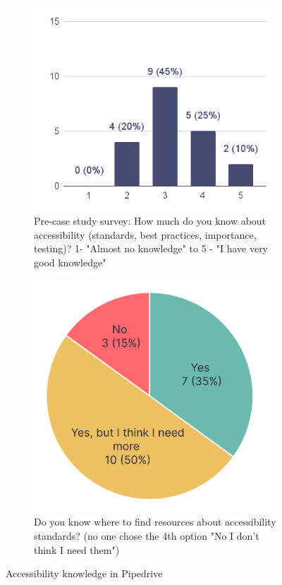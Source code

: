 \documentclass{master_thesis}
\begin{document}
\begin{figure}[ht]
    \centering
	\begin{subfigure}{0.5\textwidth}
		\includegraphics[width=\textwidth]{img/a11y-knowledge.png}
		\caption{Pre-case study survey: How much do you know about accessibility (standards, best practices, importance, testing)? 1- "Almost no knowledge" to 5 - "I have very good knowledge" }
		\label{fig:a11y-knowledge-current}
	\end{subfigure}
	\hspace{0.05\textwidth}
	\begin{subfigure}{0.4\textwidth}
		\includegraphics[width=\textwidth]{img/a11y-resources.png}
		\caption{Do you know where to find resources
		about accessibility standards? (no one chose the 4th option "No I don't think I need them") }
    	\label{fig:a11y-resources}
	\end{subfigure}
	\caption{Accessibility knowledge in Pipedrive}
    \label{fig:a11y-knowledge}
\end{figure}
\end{document}
